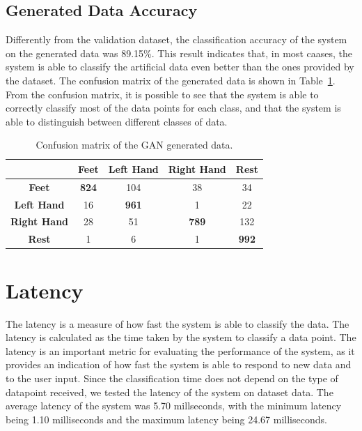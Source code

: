 \subsection*{Generated Data Accuracy}
Differently from the validation dataset, the classification accuracy of the system on the generated data was 89.15\%.
This result indicates that, in most caases, the system is able to classify the artificial data even better than the ones provided by the dataset.
The confusion matrix of the generated data is shown in Table~\ref{tab:gan_confusion_matrix}.
From the confusion matrix, it is possible to see that the system is able to correctly classify most of the data points for each class, and that the system is able to distinguish between different classes of data.
\begin{table}[!htbp]
    \centering
    \begin{tabular}{|c||c|c|c|c|}
        \hline
        & \textbf{Feet} & \textbf{Left Hand} & \textbf{Right Hand} & \textbf{Rest} \\
        \hline
        \hline
        \textbf{Feet} & \textbf{824} & 104 & 38 & 34 \\
        \hline
        \textbf{Left Hand} & 16 & \textbf{961} & 1 & 22 \\
        \hline
        \textbf{Right Hand} & 28 & 51 & \textbf{789} & 132 \\
        \hline
        \textbf{Rest} & 1 & 6 & 1 & \textbf{992} \\
        \hline
    \end{tabular}
    \caption{Confusion matrix of the GAN generated data.}\label{tab:gan_confusion_matrix}
\end{table}


\section{Latency}
The latency is a measure of how fast the system is able to classify the data.
The latency is calculated as the time taken by the system to classify a data point.
The latency is an important metric for evaluating the performance of the system, as it provides an indication of how fast the system is able to respond to new data and to the user input.
Since the classification time does not depend on the type of datapoint received, we tested the latency of the system on dataset data.
The average latency of the system was 5.70 millseconds, with the minimum latency being 1.10 milliseconds and the maximum latency being 24.67 milliseconds.

